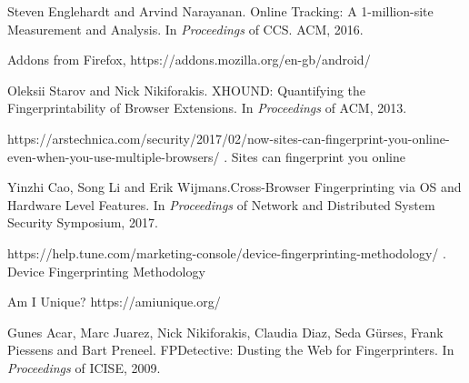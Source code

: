 \documentclass[journal]{IEEEtran}
\begin{document}
%
%
%
\begin{thebibliography}{1}

Steven Englehardt and Arvind Narayanan. Online Tracking: A 1-million-site
Measurement and Analysis. In \textit{Proceedings} of CCS. ACM,
2016.

Addons from Firefox, https://addons.mozilla.org/en-gb/android/

Oleksii Starov and Nick Nikiforakis. XHOUND: Quantifying the Fingerprintability of Browser Extensions. In \textit{Proceedings} of ACM, 2013.
  
https://arstechnica.com/security/2017/02/now-sites-can-fingerprint-you-online-even-when-you-use-multiple-browsers/ . Sites can fingerprint you online
 
Yinzhi Cao, Song Li and Erik Wijmans.Cross-Browser Fingerprinting via OS and Hardware Level Features. In \textit{Proceedings} of  Network and Distributed System Security Symposium, 2017.
   
https://help.tune.com/marketing-console/device-fingerprinting-methodology/ . Device
Fingerprinting Methodology
  
Am I Unique? https://amiunique.org/

Gunes Acar, Marc Juarez, Nick Nikiforakis, Claudia Diaz, Seda Gürses, Frank Piessens and Bart Preneel. FPDetective: Dusting the Web for Fingerprinters. In \textit{Proceedings} of ICISE, 2009.
  

\end{thebibliography}

% 
\end{document}

